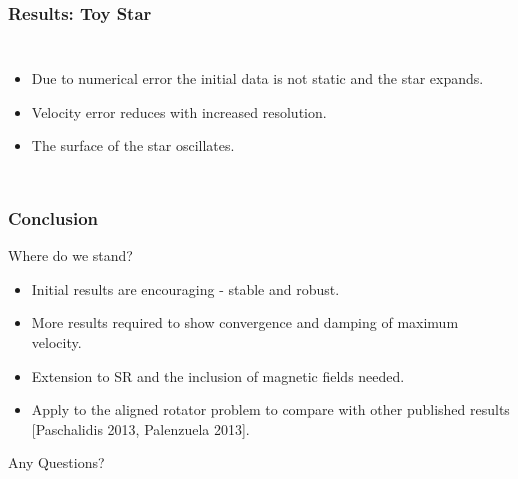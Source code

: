 \documentclass{beamer}
\begin{document}
\begin{frame}
\frametitle{Results: Toy Star}
\begin{columns}
\column{7.5cm}
\centering
\column{4.5cm}
\begin{itemize}
\item{Due to numerical error the initial data is not static and the star expands.}
\item{Velocity error reduces with increased resolution.}
\item{The surface of the star oscillates.}
\end{itemize}
\end{columns}
\end{frame}
\begin{frame}
\frametitle{Conclusion}
Where do we stand?
\begin{itemize}
\item{Initial results are encouraging - stable and robust.}
\item{More results required to show convergence and damping of maximum velocity.}
\item{Extension to SR and the inclusion of magnetic fields needed.}
\item{Apply to the aligned rotator problem to compare with other published results [Paschalidis 2013, Palenzuela 2013]. }
\end{itemize}
\centering
Any Questions?
\end{frame}
\end{document}
